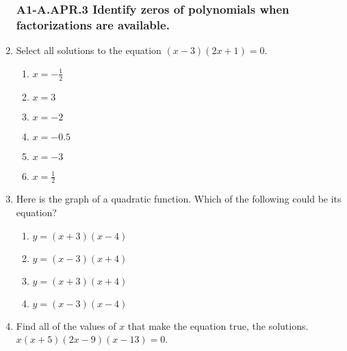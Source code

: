 \documentclass[12pt, twoside]{article}
\begin{document}
\begin{enumerate}
\subsubsection*{A1-A.APR.3 Identify zeros of polynomials when factorizations are available.}
\item Select all solutions to the equation $(x-3)(2x+1)=0$.
    \begin{multicols}{2}
    \begin{enumerate}
        \item $x=-\frac{1}{2}$
        \item $x=3$
        \item $x=-2$
        \item $x=-0.5$
        \item $x=-3$
        \item $x=\frac{1}{2}$
    \end{enumerate}
    \end{multicols}
    \vspace{0.25cm}

\item Here is the graph of a quadratic function. Which of the following could be its equation?
    \begin{center}
    \end{center}
    \begin{multicols}{2}
    \begin{enumerate}
        \item $y=(x+3)(x-4)$
        \item $y=(x-3)(x+4)$
        \item $y=(x+3)(x+4)$
        \item $y=(x-3)(x-4)$
    \end{enumerate}
    \end{multicols}

\item Find all of the values of $x$ that make the equation true, the solutions. \\[0.25cm]
$x(x+5)(2x-9)(x-13)=0$. 


\end{enumerate}
\end{document}
